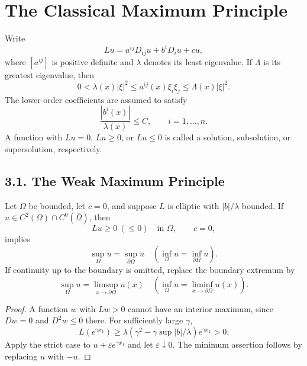 \chapter{The Classical Maximum Principle}

Write
\begin{equation}
\tag{3.1}
Lu=a^{ij}D_{ij}u+b^iD_i u+cu,
\end{equation}
where $[a^{ij}]$ is positive definite and $\lambda$ denotes its least
eigenvalue. If $\Lambda$ is its greatest eigenvalue, then
\begin{equation}
\tag{3.2}
0<\lambda(x)|\xi|^2\leq a^{ij}(x)\xi_i\xi_j
\leq\Lambda(x)|\xi|^2.
\end{equation}
The lower-order coefficients are assumed to satisfy
\begin{equation}
\tag{3.3}
\frac{|b^i(x)|}{\lambda(x)}\leq C,\qquad i=1,\ldots,n.
\end{equation}
A function with $Lu=0$, $Lu\geq0$, or $Lu\leq0$ is called a
solution, subsolution, or supersolution, respectively.

\section*{3.1. The Weak Maximum Principle}

\begin{theorem}\label{gt-ch3-wmp}
Let $\Omega$ be bounded, let $c=0$, and suppose $L$ is elliptic with
$|b|/\lambda$ bounded. If
$u\in C^2(\Omega)\cap C^0(\overline\Omega)$, then
\begin{equation}
\tag{3.4}
Lu\geq0\ (\leq0)\quad\text{in }\Omega,\qquad c=0,
\end{equation}
implies
\begin{equation}
\tag{3.5}
\sup_\Omega u=\sup_{\partial\Omega}u
\quad\left(\inf_\Omega u=\inf_{\partial\Omega}u\right).
\end{equation}
If continuity up to the boundary is omitted, replace the boundary extremum
by
\begin{equation}
\tag{3.6}
\sup_\Omega u=\limsup_{x\to\partial\Omega}u(x)
\quad\left(\inf_\Omega u=\liminf_{x\to\partial\Omega}u(x)\right).
\end{equation}
\end{theorem}
\begin{proof}
\sketch A function $w$ with $Lw>0$ cannot have an interior maximum, since
$Dw=0$ and $D^2w\leq0$ there. For sufficiently large $\gamma$,
\[
L(e^{\gamma x_1})\geq
\lambda(\gamma^2-\gamma\sup|b|/\lambda)e^{\gamma x_1}>0.
\]
Apply the strict case to $u+\varepsilon e^{\gamma x_1}$ and let
$\varepsilon\downarrow0$. The minimum assertion follows by replacing $u$
with $-u$.
\end{proof}

